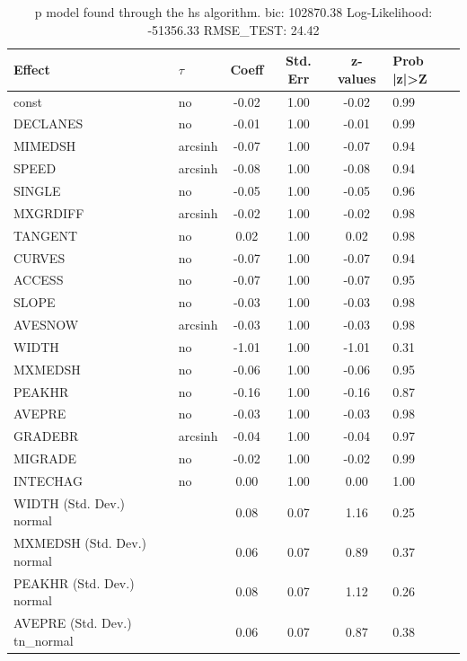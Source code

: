 \begin{table}
	\caption{p model found through the hs algorithm. bic: 102870.38 Log-Likelihood: -51356.33 RMSE_TEST: 24.42}
	\begin{center}
		\begin{tabular}{|l|l|c|c|c|l|}
			\hline
			Effect & $\tau$ & Coeff & Std. Err & z-values & Prob |z|>Z \\
			\hline
			const & no & -0.02 & 1.00 & -0.02 & 0.99 \\
			\hline
			DECLANES & no & -0.01 & 1.00 & -0.01 & 0.99 \\
			\hline
			MIMEDSH & arcsinh & -0.07 & 1.00 & -0.07 & 0.94 \\
			\hline
			SPEED & arcsinh & -0.08 & 1.00 & -0.08 & 0.94 \\
			\hline
			SINGLE & no & -0.05 & 1.00 & -0.05 & 0.96 \\
			\hline
			MXGRDIFF & arcsinh & -0.02 & 1.00 & -0.02 & 0.98 \\
			\hline
			TANGENT & no & 0.02 & 1.00 & 0.02 & 0.98 \\
			\hline
			CURVES & no & -0.07 & 1.00 & -0.07 & 0.94 \\
			\hline
			ACCESS & no & -0.07 & 1.00 & -0.07 & 0.95 \\
			\hline
			SLOPE & no & -0.03 & 1.00 & -0.03 & 0.98 \\
			\hline
			AVESNOW & arcsinh & -0.03 & 1.00 & -0.03 & 0.98 \\
			\hline
			WIDTH & no & -1.01 & 1.00 & -1.01 & 0.31 \\
			\hline
			MXMEDSH & no & -0.06 & 1.00 & -0.06 & 0.95 \\
			\hline
			PEAKHR & no & -0.16 & 1.00 & -0.16 & 0.87 \\
			\hline
			AVEPRE & no & -0.03 & 1.00 & -0.03 & 0.98 \\
			\hline
			GRADEBR & arcsinh & -0.04 & 1.00 & -0.04 & 0.97 \\
			\hline
			MIGRADE & no & -0.02 & 1.00 & -0.02 & 0.99 \\
			\hline
			INTECHAG & no & 0.00 & 1.00 & 0.00 & 1.00 \\
			\hline
			WIDTH (Std. Dev.) normal &  & 0.08 & 0.07 & 1.16 & 0.25 \\
			\hline
			MXMEDSH (Std. Dev.) normal &  & 0.06 & 0.07 & 0.89 & 0.37 \\
			\hline
			PEAKHR (Std. Dev.) normal &  & 0.08 & 0.07 & 1.12 & 0.26 \\
			\hline
			AVEPRE (Std. Dev.) tn_normal &  & 0.06 & 0.07 & 0.87 & 0.38 \\

\end{tabular}
\end{center}
\end{table}
